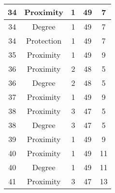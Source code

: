 \documentclass[results.tex]{subfiles}
\begin{document}
\begin{center}
\begin{tabular}{| c || c | c | c | c |}
            \hline
            34                      & Proximity                    & 1                      & 49                      & 7                    \\
            \hline
            34                      & Degree                       & 1                      & 49                      & 7                    \\
            \hline
            34                      & Protection                   & 1                      & 49                      & 7                    \\
            \hline
            35                      & Proximity                    & 1                      & 49                      & 9                    \\
            \hline
            36                      & Proximity                    & 2                      & 48                      & 5                    \\
            \hline
            36                      & Degree                       & 2                      & 48                      & 5                    \\
            \hline
            37                      & Proximity                    & 1                      & 49                      & 9                    \\
            \hline
            38                      & Proximity                    & 3                      & 47                      & 5                    \\
            \hline
            38                      & Degree                       & 3                      & 47                      & 5                    \\
            \hline
            39                      & Proximity                    & 1                      & 49                      & 9                    \\
            \hline
            40                      & Proximity                    & 1                      & 49                      & 11                   \\
            \hline
            40                      & Degree                       & 1                      & 49                      & 11                   \\
            \hline
            41                      & Proximity                    & 3                      & 47                      & 13                   \\

\end{tabular}
\end{center}
\end{document}

